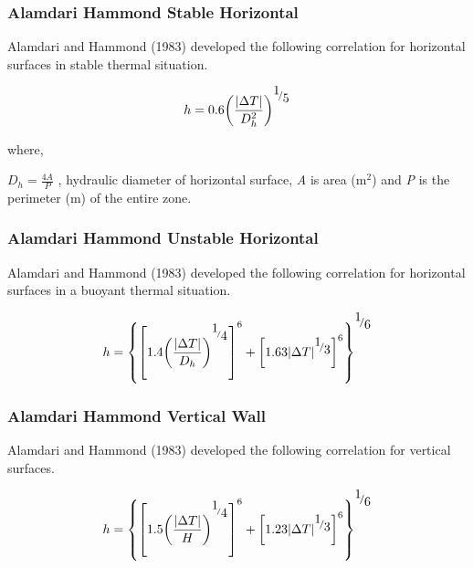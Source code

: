 \subsubsection{Alamdari Hammond Stable Horizontal}\label{alamdari-hammond-stable-horizontal}

Alamdari and Hammond (1983) developed the following correlation for horizontal surfaces in stable thermal situation.

\begin{equation}
h = 0.6{\left( {\frac{{\left| {\Delta T} \right|}}{{D_h^2}}} \right)^{{\raise0.7ex\hbox{1} \!\mathord{\left/ {\vphantom {1 5}}\right.}\!\lower0.7ex\hbox{5}}}}
\end{equation}

where,

\({D_h} = \frac{{4A}}{P}\) , hydraulic diameter of horizontal surface, \emph{A} is area (m\(^{2}\)) and \emph{P} is the perimeter (m) of the entire zone.

\subsubsection{Alamdari Hammond Unstable Horizontal}\label{alamdari-hammond-unstable-horizontal}

Alamdari and Hammond (1983) developed the following correlation for horizontal surfaces in a buoyant thermal situation.

\begin{equation}
h = {\left\{ {{{\left[ {1.4{{\left( {\frac{{\left| {\Delta T} \right|}}{{{D_h}}}} \right)}^{^{{\raise0.7ex\hbox{1} \!\mathord{\left/ {\vphantom {1 4}}\right.}\!\lower0.7ex\hbox{4}}}}}} \right]}^6} + {{\left[ {1.63{{\left| {\Delta T} \right|}^{{\raise0.7ex\hbox{1} \!\mathord{\left/ {\vphantom {1 3}}\right.}\!\lower0.7ex\hbox{3}}}}} \right]}^6}} \right\}^{{\raise0.7ex\hbox{1} \!\mathord{\left/ {\vphantom {1 6}}\right.}\!\lower0.7ex\hbox{6}}}}
\end{equation}

\subsubsection{Alamdari Hammond Vertical Wall}\label{alamdari-hammond-vertical-wall}

Alamdari and Hammond (1983) developed the following correlation for vertical surfaces.

\begin{equation}
h = {\left\{ {{{\left[ {1.5{{\left( {\frac{{\left| {\Delta T} \right|}}{H}} \right)}^{^{{\raise0.7ex\hbox{1} \!\mathord{\left/ {\vphantom {1 4}}\right.}\!\lower0.7ex\hbox{4}}}}}} \right]}^6} + {{\left[ {1.23{{\left| {\Delta T} \right|}^{{\raise0.7ex\hbox{1} \!\mathord{\left/ {\vphantom {1 3}}\right.}\!\lower0.7ex\hbox{3}}}}} \right]}^6}} \right\}^{{\raise0.7ex\hbox{1} \!\mathord{\left/ {\vphantom {1 6}}\right.}\!\lower0.7ex\hbox{6}}}}
\end{equation}

